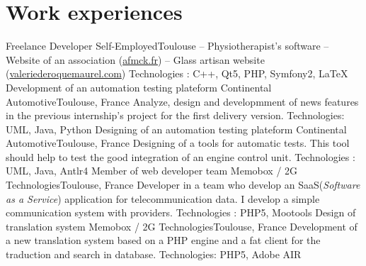 \documentclass{my_cv_bis_en}
\begin{document}
 {
}{}

\section{Work experiences}
	{Freelance Developer}
	{Self-Employed}{Toulouse}
	{
		-- Physiotherapist's software\newline
		-- Website of an association (\url{afmck.fr})\newline
		-- Glass artisan website (\url{valeriederoquemaurel.com})\newline
	}
	{
	Technologies : C++, Qt5, PHP, Symfony2, \LaTeX{}
	\vspace{15px}
	}
	\vspace{15px}
	{Development of an automation testing plateform}
	{Continental Automotive}{Toulouse, France}
	{
	Analyze, design and developmment of news features in the previous internship's project for the first delivery version. \newline
	Technologies: UML, Java, Python
	}
	{}
	\vspace{15px}
	{Designing of an automation testing plateform}
	{Continental Automotive}{Toulouse, France}
	{
	Designing of a tools for automatic tests. This tool should help to test the good integration of an engine control unit.\newpage
	Technologies : UML, Java, Antlr4
	}
	{}
	\vspace{15px}
	{Member of web developer team}
	{Memobox / 2G Technologies}{Toulouse, France}
	{Developer in a team who develop an SaaS(\textit{Software as a Service}) application for telecommunication data. I develop a
	simple communication system with providers.\newpage
	Technologies : PHP5, Mootools} {}
	\vspace{15px}
	{ Design of translation system}
	{Memobox / 2G Technologies}{Toulouse, France}
	{
	Development of a new translation system based on a PHP engine and a fat client for the traduction and search in
	database.\newpage
	Technologies: PHP5, Adobe AIR} {}
\end{document}
